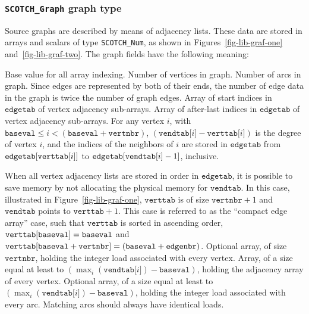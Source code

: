 \subsubsection{\texttt{SCOTCH\_\lbt Graph} graph type}
\label{sec-lib-type-graph}

Source graphs are described by means of adjacency lists. These data
are stored in arrays and scalars of type \texttt{SCOTCH\_Num}, as
shown in Figures~\ref{fig-lib-graf-one}
and~\ref{fig-lib-graf-two}. The graph fields have the following
meaning:
\begin{itemize}
Base value for all array indexing.
Number of vertices in graph.
Number of arcs in graph. Since edges are represented by both of their
ends, the number of edge data in the graph is twice the number of
graph edges.
Array of start indices in $\mathtt{edgetab}$ of vertex
adjacency sub-arrays.
Array of after-last indices in $\mathtt{edgetab}$ of vertex
adjacency sub-arrays.
For any vertex $i$, with $\mathtt{baseval} \leq i < (\mathtt{baseval}
+ \mathtt{vertnbr})$,
$(\mathtt{vendtab[}i\mathtt{]} - \mathtt{verttab[}i\mathtt{]})$ is the
degree of vertex $i$, and the indices of the neighbors of $i$ are
stored in $\mathtt{edgetab}$ from $\mathtt{edgetab[\lbt
verttab[}i\mathtt{]]}$ to $\mathtt{edgetab[\lbt
vendtab[}i\mathtt{]} - 1\mathtt{]}$, inclusive.

When all vertex adjacency lists are stored in order in
$\mathtt{edgetab}$, it is possible to save memory by not allocating
the physical memory for $\mathtt{vendtab}$. In this case, illustrated
in Figure~\ref{fig-lib-graf-one}, $\mathtt{verttab}$ is of size
$\mathtt{vertnbr} + 1$ and $\mathtt{vendtab}$ points to
$\mathtt{verttab} + 1$. This case is referred to as the ``compact edge
array'' case, such that $\mathtt{verttab}$ is sorted in ascending
order, $\mathtt{verttab[\lbt baseval]} = \mathtt{baseval}$ and
$\mathtt{verttab[\lbt baseval} + \mathtt{vertnbr]} =
(\mathtt{baseval} + \mathtt{edgenbr})$.
Optional array, of size $\mathtt{vertnbr}$, holding the integer load
associated with every vertex.
Array, of a size equal at least to
$\left(\max_{i}(\mathtt{vendtab[}i\mathtt{]}) -
\mathtt{baseval}\right)$, holding the adjacency array of every
vertex.
Optional array, of a size equal at least to
$\left(\max_{i}(\mathtt{vendtab[} i \mathtt{]}) -
\mathtt{baseval}\right)$, holding the integer load associated with
every arc. Matching arcs should always have identical loads.
\end{itemize}


